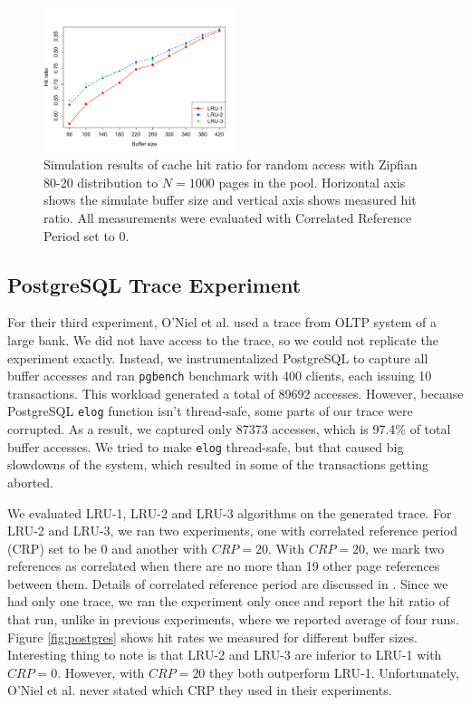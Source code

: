 \begin{figure}[t!]
    \centering
	\includegraphics[width=0.5\textwidth]{./figures/zipfian.pdf}
	\caption{Simulation results of cache hit ratio for random access with Zipfian 80-20 distribution to $N = 1000$ pages in the pool. Horizontal axis shows the simulate buffer size and vertical axis shows measured hit ratio. All measurements were evaluated with Correlated Reference Period set to 0.}
	\label{fig:zipfian}
\end{figure}


\subsection{PostgreSQL Trace Experiment}

For their third experiment, O'Niel et al. \cite{lruk} used a trace from OLTP system of a large bank. We did not have access to the trace, so we could not replicate the experiment exactly. Instead, we instrumentalized PostgreSQL to capture all buffer accesses and ran \texttt{pgbench} benchmark with 400 clients, each issuing 10 transactions. This workload generated a total of 89692 accesses. However, because PostgreSQL \texttt{elog} function isn't thread-safe, some parts of our trace were corrupted. As a result, we captured only 87373 accesses, which is 97.4\% of total buffer accesses. We tried to make \texttt{elog} thread-safe, but that caused big slowdowns of the system, which resulted in some of the transactions getting aborted.

We evaluated LRU-1, LRU-2 and LRU-3 algorithms on the generated trace. For LRU-2 and LRU-3, we ran two experiments, one with correlated reference period (CRP) set to be 0 and another with $CRP = 20$. With $CRP = 20$, we mark two references as correlated when there are no more than 19 other page references between them. Details of correlated reference period are discussed in \cite{lruk}. Since we had only one trace, we ran the experiment only once and report the hit ratio of that run, unlike in previous experiments, where we reported average of four runs. Figure \ref{fig:postgres} shows hit rates we measured for different buffer sizes. Interesting thing to note is that LRU-2 and LRU-3 are inferior to LRU-1 with $CRP = 0$. However, with $CRP = 20$ they both outperform LRU-1. Unfortunately, O'Niel et al. \cite{lruk} never stated which CRP they used in their experiments.

